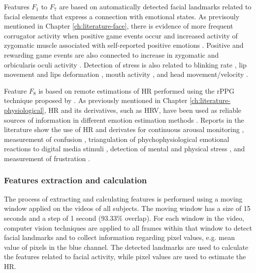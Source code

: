 Features $F_1$ to $F_7$ are based on automatically detected facial landmarks related to facial elements that express a connection with emotional states. As previsouly mentioned in Chapter \ref{ch:literature-face}, there is evidence of more frequent corrugator activity when positive game events occur \parencite{hazlett2006measuring} and increased activity of zygomatic muscle associated with self-reported positive emotions \parencite{tijs2008dynamic}. Positive and rewarding game events are also connected to increase in zygomatic and orbicularis oculi activity \parencite{ravaja20051}. Detection of stress is also related to blinking rate \parencite{giannakakis2017stress,dinges2005optical}, lip movement \parencite{dinges2005optical} and lips deformation \parencite{metaxas2004image,giannakakis2017stress}, mouth activity \parencite{liao2005decision}, and head movement/velocity \parencite{giannakakis2017stress}.

Feature $F_8$ is based on remote estimations of HR performed using the rPPG technique proposed by \textcite{poh2011advancements}. As previously mentioned in Chapter \ref{ch:literature-physiological}, HR and its derivatives, such as HRV, have been used as reliable sources of information in different emotion estimation methods \parencite{kukolja2014comparative}. Reports in the literature show the use of HR and derivates for continuous arousal monitoring \parencite{grundlehner2009design}, measurement of confusion \parencite{xiao2015towards}, triangulation of phychophysiological emotional reactions to digital media stimuli \parencite{nogueira2015annotation}, detection of mental and physical stress \parencite{vandeput2009heart,garde2002effects}, and measurement of frustration \parencite{rodriguez2015vr}.

\subsubsection{Features extraction and calculation}

The process of extracting and calculating features is performed using a moving window applied on the videos of all subjects. The moving window has a size of 15 seconds and a step of 1 second (93.33\% overlap). For each window in the video, computer vision techniques are applied to all frames within that window to detect facial landmarks and to collect information regarding pixel values, e.g. mean value of pixels in the blue channel. The detected landmarks are used to calculate the features related to facial activity, while pixel values are used to estimate the HR.

